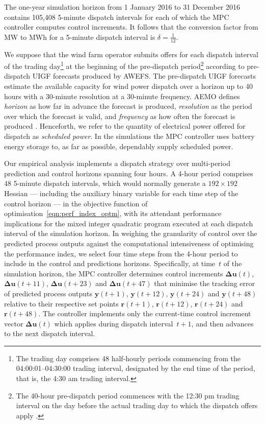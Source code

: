 \documentclass[a4paper, 10pt, twocolumn, preprint, 3p]{elsarticle}
\def\mwmwh{\delta}
\begin{document}
The one-year simulation horizon from 1 January 2016 to 31 December 2016 contains 105,408 5-minute dispatch intervals for each of which the MPC controller computes control increments.  It follows that the conversion factor from MW to MWh for a 5-minute dispatch interval is $\mwmwh = \tfrac{1}{12}$.

We suppose that the wind farm operator submits offers for each dispatch interval of the trading day\footnote{
The trading day comprises 48 half-hourly periods commencing from the 04:00:01--04:30:00 trading interval, designated by the end time of the period, that is, the 4:30 am trading interval.
} at the beginning of the pre-dispatch period\footnote{
The 40-hour pre-dispatch period commences with the 12:30 pm trading interval on the day before the actual trading day to which the dispatch offers apply \cite{AEMO10}.
} according to pre-dispatch UIGF forecasts produced by AWEFS.  The pre-dispatch UIGF forecasts estimate the available capacity for wind power dispatch over a horizon up to 40 hours with a 30-minute resolution at a 30-minute frequency.  AEMO defines \textit{horizon} as how far in advance the forecast is produced, \textit{resolution} as the period over which the forecast is valid, and \textit{frequency} as how often the forecast is produced \cite{AEMO16b}.  Henceforth, we refer to the quantity of electrical power offered for dispatch as \textit{scheduled power}.  In the simulations the MPC controller uses battery energy storage to, as far as possible, dependably supply scheduled power.

Our empirical analysis implements a dispatch strategy over multi-period prediction and control horizons spanning four hours.  A 4-hour period comprises 48 5-minute dispatch intervals, which would normally generate a $192 \times 192$ Hessian --- including the auxiliary binary variable for each time step of the control horizon --- in the objective function of optimisation~\eqref{eqn:perf_index_optm}, with its attendant performance implications for the mixed integer quadratic program executed at each dispatch interval of the simulation horizon.  In weighing the granularity of control over the predicted process outputs against the computational intensiveness of optimising the performance index, we select four time steps from the 4-hour period to include in the control and predictions horizons.  Specifically, at time~$t$ of the simulation horizon, the MPC controller determines control increments $\boldsymbol{\Delta{u}}(t)$, $\boldsymbol{\Delta{u}}(t\!+\!11)$, $\boldsymbol{\Delta{u}}(t\!+\!23)$ and $\boldsymbol{\Delta{u}}(t\!+\!47)$ that minimise the tracking error of predicted process outputs $\boldsymbol{y}(t\!+\!1)$, $\boldsymbol{y}(t\!+\!12)$, $\boldsymbol{y}(t\!+\!24)$ and $\boldsymbol{y}(t\!+\!48)$ relative to their respective set points $\boldsymbol{r}(t\!+\!1)$, $\boldsymbol{r}(t\!+\!12)$, $\boldsymbol{r}(t\!+\!24)$ and $\boldsymbol{r}(t\!+\!48)$.  The controller implements only the current-time control increment vector $\boldsymbol{\Delta{u}}(t)$ which applies during dispatch interval~$t\!+\!1$, and then advances to the next dispatch interval.
\end{document}
